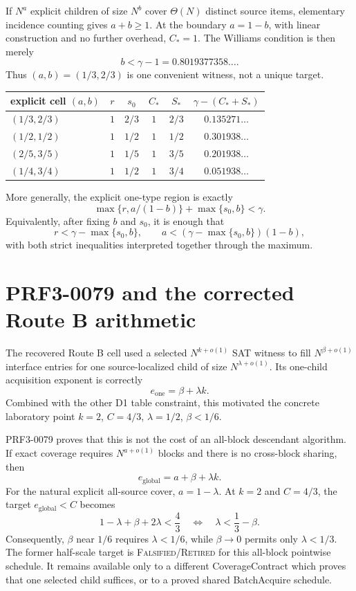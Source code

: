 \documentclass[11pt]{article}
\begin{document}
If $N^a$ explicit children of size $N^b$ cover $\Theta(N)$ distinct source
items, elementary incidence counting gives $a+b\geq1$.  At the boundary
$a=1-b$, with linear construction and no further overhead, $C_*=1$.  The
Williams condition is then merely
\[
 b<\gamma-1=0.8019377358\ldots.
\]
Thus $(a,b)=(1/3,2/3)$ is one convenient witness, not a unique target.

\begin{center}
\begin{tabular}{lccccc}
\toprule
explicit cell $(a,b)$ & $r$ & $s_0$ & $C_*$ & $S_*$ & $\gamma-(C_*+S_*)$\\
\midrule
$(1/3,2/3)$ & $1$ & $2/3$ & $1$ & $2/3$ & $0.135271\ldots$\\
$(1/2,1/2)$ & $1$ & $1/2$ & $1$ & $1/2$ & $0.301938\ldots$\\
$(2/5,3/5)$ & $1$ & $1/5$ & $1$ & $3/5$ & $0.201938\ldots$\\
$(1/4,3/4)$ & $1$ & $1/2$ & $1$ & $3/4$ & $0.051938\ldots$\\
\bottomrule
\end{tabular}
\end{center}

More generally, the explicit one-type region is exactly
\[
 \max\{r,a/(1-b)\}+\max\{s_0,b\}<\gamma.
\]
Equivalently, after fixing $b$ and $s_0$, it is enough that
\[
 r<\gamma-\max\{s_0,b\},\qquad
 a<(\gamma-\max\{s_0,b\})(1-b),
\]
with both strict inequalities interpreted together through the maximum.

\section{PRF3-0079 and the corrected Route B arithmetic}

The recovered Route B cell used a selected $N^{k+o(1)}$ SAT witness to fill
$N^{\beta+o(1)}$ interface entries for one source-localized child of size
$N^{\lambda+o(1)}$.  Its one-child acquisition exponent is correctly
\[
 e_{\mathrm{one}}=\beta+\lambda k.
\]
Combined with the other D1 table constraint, this motivated the concrete
laboratory point $k=2$, $C=4/3$, $\lambda=1/2$, $\beta<1/6$.

PRF3-0079 proves that this is not the cost of an all-block descendant
algorithm.  If exact coverage requires $N^{a+o(1)}$ blocks and there is no
cross-block sharing, then
\begin{equation}
 e_{\mathrm{global}}=a+\beta+\lambda k.\label{eq:globalacq}
\end{equation}
For the natural explicit all-source cover, $a=1-\lambda$.  At $k=2$ and
$C=4/3$, the target $e_{\mathrm{global}}<C$ becomes
\[
 1-\lambda+\beta+2\lambda<\frac43
 \quad\Longleftrightarrow\quad
 \boxed{\lambda<\frac13-\beta.}
\]
Consequently, $\beta$ near $1/6$ requires $\lambda<1/6$, while
$\beta\to0$ permits only $\lambda<1/3$.  The former half-scale target is
\textsc{Falsified/Retired} for this all-block pointwise schedule.  It remains
available only to a different CoverageContract which proves that one selected
child suffices, or to a proved shared BatchAcquire schedule.
\end{document}
